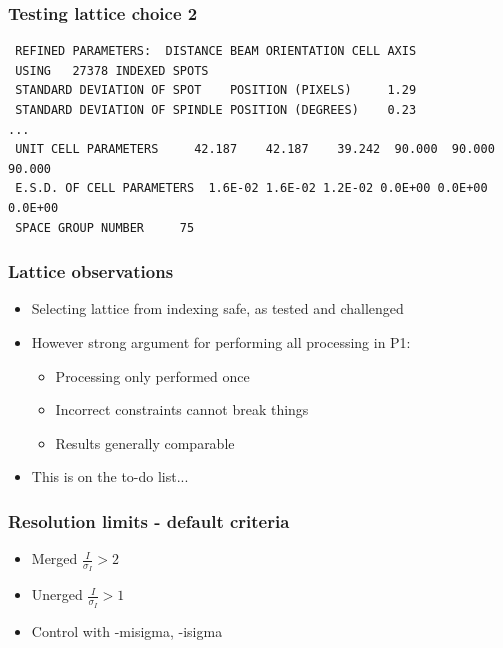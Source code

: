 \documentclass[slides,compress]{beamer}
\begin{document}
\begin{frame}[fragile]
\frametitle{Testing lattice choice 2}
{\small
\begin{verbatim}
 REFINED PARAMETERS:  DISTANCE BEAM ORIENTATION CELL AXIS                   
 USING   27378 INDEXED SPOTS
 STANDARD DEVIATION OF SPOT    POSITION (PIXELS)     1.29
 STANDARD DEVIATION OF SPINDLE POSITION (DEGREES)    0.23
...
 UNIT CELL PARAMETERS     42.187    42.187    39.242  90.000  90.000  90.000
 E.S.D. OF CELL PARAMETERS  1.6E-02 1.6E-02 1.2E-02 0.0E+00 0.0E+00 0.0E+00
 SPACE GROUP NUMBER     75
\end{verbatim}
}
\end{frame}

\begin{frame}
\frametitle{Lattice observations}
\begin{itemize}
\item{Selecting lattice from indexing safe, as tested and challenged}
\item{However strong argument for performing all processing in P1:
\begin{itemize}
\item{Processing only performed once}
\item{Incorrect constraints cannot break things}
\item{Results generally comparable}
\end{itemize}
}
\item{This is on the to-do list...}
\end{itemize}
\end{frame}

\begin{frame}
\frametitle{Resolution limits - default criteria}
\begin{itemize}
\item{Merged $\frac{I}{\sigma_I} > 2$}
\item{Unerged $\frac{I}{\sigma_I} > 1$}
\item{Control with -misigma, -isigma}
\end{itemize}
\end{frame}
\end{document}
